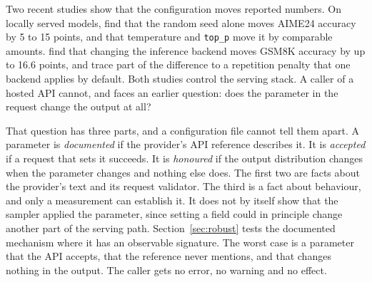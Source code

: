 \documentclass[10pt]{article}
\newcommand{\p}[1]{\texttt{#1}}
\begin{document}
Two recent studies show that the configuration moves reported numbers. On locally served models, \citet{hochlehnert2025sober} find that the random seed alone moves AIME24 accuracy by 5 to 15 points, and that temperature and \p{top\_p} move it by comparable amounts. \citet{pape2026silent} find that changing the inference backend moves GSM8K accuracy by up to 16.6 points, and trace part of the difference to a repetition penalty that one backend applies by default. Both studies control the serving stack. A caller of a hosted API cannot, and faces an earlier question: does the parameter in the request change the output at all?

That question has three parts, and a configuration file cannot tell them apart. A parameter is \emph{documented} if the provider's API reference describes it. It is \emph{accepted} if a request that sets it succeeds. It is \emph{honoured} if the output distribution changes when the parameter changes and nothing else does. The first two are facts about the provider's text and its request validator. The third is a fact about behaviour, and only a measurement can establish it. It does not by itself show that the sampler applied the parameter, since setting a field could in principle change another part of the serving path. Section~\ref{sec:robust} tests the documented mechanism where it has an observable signature. The worst case is a parameter that the API accepts, that the reference never mentions, and that changes nothing in the output. The caller gets no error, no warning and no effect.
\end{document}
